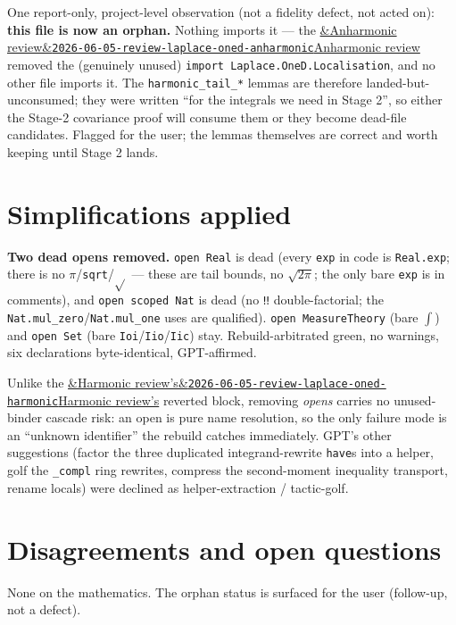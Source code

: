 \documentclass[11pt]{article}
\newcommand{\reviewref}[2][]{\href{https://therisensea.org/reviews/#2/}{\ifx&#1&\texttt{#2}\else#1\fi}}
\begin{document}
One report-only, project-level observation (not a fidelity defect, not acted on): \textbf{this file is now an
orphan.} Nothing imports it --- the \reviewref[Anharmonic review]{2026-06-05-review-laplace-oned-anharmonic}
removed the (genuinely unused) \texttt{import Laplace.OneD.Localisation}, and no other file imports it. The
\texttt{harmonic\_tail\_*} lemmas are therefore landed-but-unconsumed; they were written ``for the integrals we
need in Stage 2'', so either the Stage-2 covariance proof will consume them or they become dead-file
candidates. Flagged for the user; the lemmas themselves are correct and worth keeping until Stage 2 lands.

\section{Simplifications applied}
\textbf{Two dead opens removed.} \texttt{open Real} is dead (every \texttt{exp} in code is \texttt{Real.exp};
there is no $\pi$/\texttt{sqrt}/$\sqrt{}$ --- these are tail bounds, no $\sqrt{2\pi}$; the only bare
\texttt{exp} is in comments), and \texttt{open scoped Nat} is dead (no \texttt{‼} double-factorial; the
\texttt{Nat.mul\_zero}/\texttt{Nat.mul\_one} uses are qualified). \texttt{open MeasureTheory} (bare $\int$) and
\texttt{open Set} (bare \texttt{Ioi}/\texttt{Iio}/\texttt{Iic}) stay. Rebuild-arbitrated green, no warnings,
six declarations byte-identical, GPT-affirmed.

Unlike the \reviewref[Harmonic review's]{2026-06-05-review-laplace-oned-harmonic} reverted block, removing
\emph{opens} carries no unused-binder cascade risk: an open is pure name resolution, so the only failure mode
is an ``unknown identifier'' the rebuild catches immediately. GPT's other suggestions (factor the three
duplicated integrand-rewrite \texttt{have}s into a helper, golf the \texttt{\_compl} ring rewrites, compress
the second-moment inequality transport, rename locals) were declined as helper-extraction / tactic-golf.

\section{Disagreements and open questions}
None on the mathematics. The orphan status is surfaced for the user (follow-up, not a defect).
\end{document}
